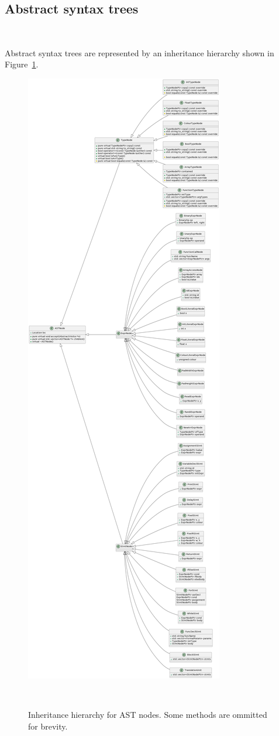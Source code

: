 \documentclass[11pt,a4paper]{scrartcl}
\begin{document}

\subsection{Abstract syntax trees}~\label{sec:ast}

Abstract syntax trees are represented by an inheritance hierarchy shown in Figure~\ref{fig:ast-hierarchy}.

\begin{figure}
  \centering
  \includegraphics[height=0.95\textheight]{ast_uml}
  \caption{Inheritance hierarchy for AST nodes. Some methods are ommitted for brevity.}~\label{fig:ast-hierarchy}
\end{figure}
\end{document}
